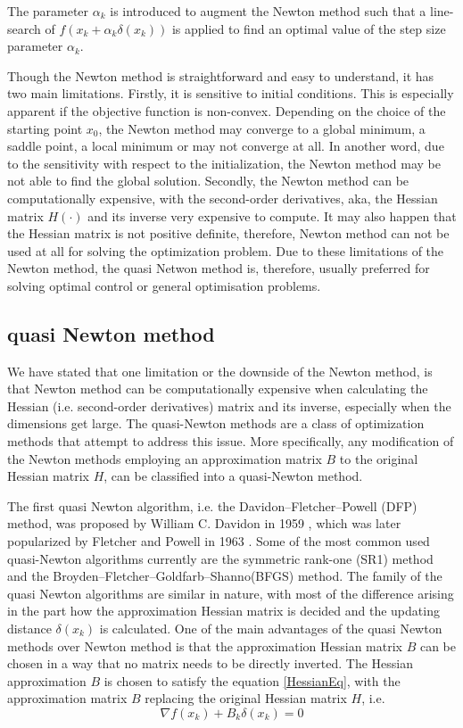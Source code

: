 \documentclass  [
  paper    = a4,
  BCOR     = 10mm,
  twoside,
  fontsize = 12pt,
  fleqn,
  toc      = bibnumbered,
  toc      = listofnumbered,
  numbers  = noendperiod,
  headings = normal,
  listof   = leveldown,
  version  = 3.03
]                                       {scrreprt}
\newcommand{\<}{\langle}
\renewcommand{\>}{\rangle}
\begin{document}
The parameter $\alpha_k$ is introduced to augment the Newton method such that a line-search of $f(x_k + \alpha_k \delta(x_k))$ is applied to find an optimal value of the step size parameter $\alpha_k$. 

Though the Newton method is straightforward and easy to understand, it has two main limitations. Firstly, it is sensitive to initial conditions. This is especially apparent if the objective function is non-convex. Depending on the choice of the starting point $x_0$, the Newton method may converge to a global minimum, a saddle point, a local minimum or may not converge at all. In another word, due to the sensitivity with respect to the initialization, the Newton method may be not able to find the global solution. Secondly, the Newton method can be computationally expensive, with the second-order derivatives, aka, the Hessian matrix $H(\cdot)$ and its inverse very expensive to compute. It may also happen that the Hessian matrix is not positive definite, therefore, Newton method can not be used at all for solving the optimization problem. Due to these limitations of the Newton method, the quasi Netwon method is, therefore, usually preferred for solving optimal control or general optimisation problems. 

\subsection{quasi Newton method}
We have stated that one limitation or the downside of the Newton method, is that Newton method can be computationally expensive when calculating the Hessian (i.e. second-order derivatives)  matrix and its inverse, especially when the dimensions get large. The quasi-Newton methods are a class of optimization methods that attempt to address this issue. More specifically, any modification of the Newton methods employing an approximation matrix $B$ to the original Hessian matrix $H$, can be classified into a quasi-Newton method. 

The first quasi Newton algorithm, i.e. the Davidon–Fletcher–Powell (DFP) method, was proposed by William C. Davidon in 1959 \cite{WilDav59}, which was later popularized by Fletcher and Powell in 1963 \cite{FlePow63}. Some of the most common used quasi-Newton algorithms currently are the symmetric rank-one (SR1) method \cite{ANP91} and the Broyden–Fletcher–Goldfarb–Shanno(BFGS) method. The family of the quasi Newton algorithms are similar in nature, with most of the difference arising in the part how the approximation Hessian matrix is decided and the updating distance $\delta(x_k) $ is calculated. One of the main advantages of the quasi Newton methods over Newton method is that the approximation Hessian matrix $B$ can be chosen in a way that no matrix needs to be directly inverted. The Hessian approximation $B$ is chosen to satisfy the equation \ref{HessianEq}, with the approximation matrix $B$ replacing the original Hessian matrix $H$, i.e. 
\begin{equation}
	\nabla f(x_k) +B_k\delta(x_k) =0
	\label{HessianAppro}
\end{equation}
\end{document}
